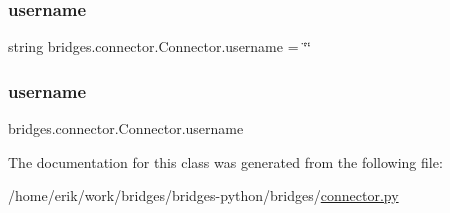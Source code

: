 \subsubsection{\texorpdfstring{username}{username}\hspace{0.1cm}{\footnotesize\ttfamily [1/2]}}
{\footnotesize\ttfamily string bridges.\+connector.\+Connector.\+username = \char`\"{}\char`\"{}\hspace{0.3cm}{\ttfamily [static]}}

\mbox{\label{classbridges_1_1connector_1_1_connector_adeb8d1b493eae70c24127fb175e1bfe7}} 
\subsubsection{\texorpdfstring{username}{username}\hspace{0.1cm}{\footnotesize\ttfamily [2/2]}}
{\footnotesize\ttfamily bridges.\+connector.\+Connector.\+username}



The documentation for this class was generated from the following file\+:\begin{DoxyCompactItemize}
\item 
/home/erik/work/bridges/bridges-\/python/bridges/\hyperlink{connector_8py}{connector.\+py}\end{DoxyCompactItemize}
